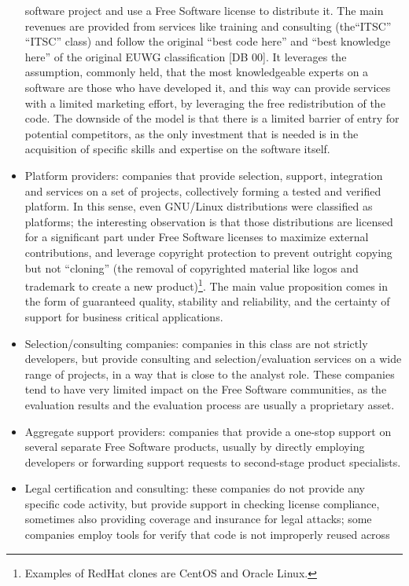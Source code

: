 \begin{itemize}
software project and use a Free Software license to distribute it. The main
revenues are provided from services like training and consulting (the“ITSC” ``ITSC'' class) and follow the original ``best code here'' and ``best knowledge here'' of the original EUWG classification [DB 00]. It leverages the assumption, commonly held, that the most knowledgeable experts on a software are those who have developed it, and this way can provide services with a limited marketing effort, by leveraging the free redistribution of the code. The downside of the model is that there is a limited barrier of entry for potential competitors, as the only investment that is needed is in the acquisition of specific skills and expertise on the software itself.
 \item Platform providers: companies that provide selection, support,
integration and services on a set of projects, collectively forming a tested and
verified platform. In this sense, even GNU/Linux distributions were classified
as platforms; the interesting observation is that those distributions are
licensed for a significant part under Free Software licenses to maximize
external contributions, and leverage copyright protection to prevent outright
copying but not ``cloning'' (the removal of copyrighted material like logos and
trademark to create a new product)\footnote{Examples of RedHat clones are CentOS
and Oracle Linux.}. The main value proposition comes in the
form of guaranteed quality, stability and reliability, and the certainty of
support for business critical applications.
 \item Selection/consulting companies: companies in this class are not strictly
developers, but provide consulting and selection/evaluation services on a wide
range of projects, in a way that is close to the analyst role. These companies
tend to have very limited impact on the Free Software communities, as the
evaluation results and the evaluation process are usually a proprietary asset.
 \item Aggregate support providers: companies that provide a one-stop support on
several separate Free Software products, usually by directly employing
developers or forwarding support requests to second-stage product specialists.
 \item Legal certification and consulting: these companies do not provide any
specific code activity, but provide support in checking license compliance,
sometimes also providing coverage and insurance for legal attacks; some
companies employ tools for verify that code is not improperly reused across

\end{itemize}

